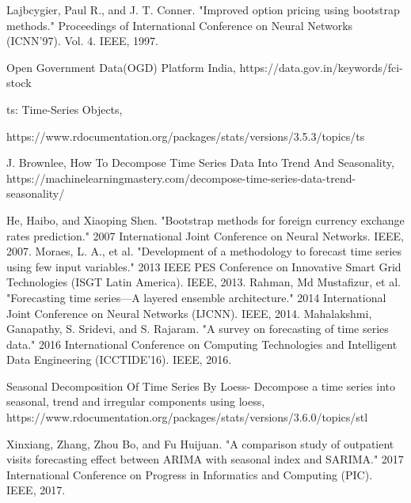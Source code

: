 \documentclass[runningheads]{llncs}
\begin{document}
\begin{thebibliography}{8}

Lajbcygier, Paul R., and J. T. Conner. "Improved option pricing using bootstrap methods." Proceedings of International Conference on Neural Networks (ICNN'97). Vol. 4. IEEE, 1997.

 Open Government Data(OGD) Platform India,
https://data.gov.in/keywords/fci-stock

 ts: Time-Series Objects,

https://www.rdocumentation.org/packages/stats/versions/3.5.3/topics/ts

 J. Brownlee, How To Decompose Time Series Data Into Trend And Seasonality,
https://machinelearningmastery.com/decompose-time-series-data-trend-seasonality/

He, Haibo, and Xiaoping Shen. "Bootstrap methods for foreign currency exchange rates prediction." 2007 International Joint Conference on Neural Networks. IEEE, 2007.
Moraes, L. A., et al. "Development of a methodology to forecast time series using few input variables." 2013 IEEE PES Conference on Innovative Smart Grid Technologies (ISGT Latin America). IEEE, 2013.
Rahman, Md Mustafizur, et al. "Forecasting time series—A layered ensemble architecture." 2014 International Joint Conference on Neural Networks (IJCNN). IEEE, 2014.
Mahalakshmi, Ganapathy, S. Sridevi, and S. Rajaram. "A survey on forecasting of time series data." 2016 International Conference on Computing Technologies and Intelligent Data Engineering (ICCTIDE'16). IEEE, 2016.

 Seasonal Decomposition Of Time Series By Loess-
Decompose a time series into seasonal, trend and irregular components using loess,
https://www.rdocumentation.org/packages/stats/versions/3.6.0/topics/stl

Xinxiang, Zhang, Zhou Bo, and Fu Huijuan. "A comparison study of outpatient visits forecasting effect between ARIMA with seasonal index and SARIMA." 2017 International Conference on Progress in Informatics and Computing (PIC). IEEE, 2017.


\end{thebibliography}
\end{document}
